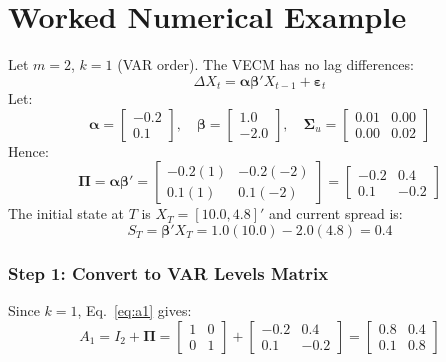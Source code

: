 \documentclass[10pt,a4paper,twocolumn]{article}
\newcommand{\Delt}{\Delta}
\newcommand{\bPi}{\boldsymbol{\Pi}}
\newcommand{\balpha}{\boldsymbol{\alpha}}
\newcommand{\bbeta}{\boldsymbol{\beta}}
\newcommand{\bSigma}{\boldsymbol{\Sigma}}
\newcommand{\beps}{\boldsymbol{\varepsilon}}
\begin{document}
\section{Worked Numerical Example}

\begin{tcolorbox}[exbox={2-Asset Cointegrated System Setup}]
Let $m=2$, $k=1$ (VAR order). The VECM has no lag differences:
\[
  \Delt X_t = \balpha \bbeta' X_{t-1} + \beps_t
\]
Let:
\[
  \balpha = \begin{bmatrix} -0.2 \\ 0.1 \end{bmatrix}, \quad
  \bbeta = \begin{bmatrix} 1.0 \\ -2.0 \end{bmatrix}, \quad
  \bSigma_u = \begin{bmatrix} 0.01 & 0.00 \\ 0.00 & 0.02 \end{bmatrix}
\]
Hence:
\[
  \bPi = \balpha \bbeta' = \begin{bmatrix} -0.2(1) & -0.2(-2) \\ 0.1(1) & 0.1(-2) \end{bmatrix} = \begin{bmatrix} -0.2 & 0.4 \\ 0.1 & -0.2 \end{bmatrix}
\]
The initial state at $T$ is $X_T = [10.0, 4.8]'$ and current spread is:
\[
  S_T = \bbeta' X_T = 1.0(10.0) - 2.0(4.8) = 0.4
\]
\end{tcolorbox}

\subsubsection{Step 1: Convert to VAR Levels Matrix}
Since $k=1$, Eq.~\eqref{eq:a1} gives:
\[
  A_1 = I_2 + \bPi = \begin{bmatrix} 1 & 0 \\ 0 & 1 \end{bmatrix} + \begin{bmatrix} -0.2 & 0.4 \\ 0.1 & -0.2 \end{bmatrix} = \begin{bmatrix} 0.8 & 0.4 \\ 0.1 & 0.8 \end{bmatrix}
\]
\end{document}
